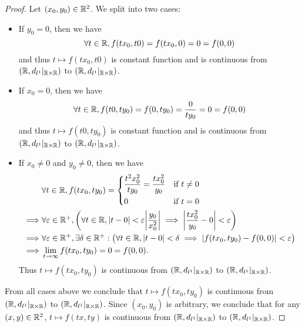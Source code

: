 \begin{proof}
  Let \((x_0, y_0) \in \mathbb{R}^2\).
  We split into two cases:
  \begin{itemize}
    \item If \(y_0 = 0\), then we have
          \[
            \forall t \in \mathbb{R}, f(t x_0, t0) = f(t x_0, 0) = 0 = f(0, 0)
          \]
          and thus \(t \mapsto f(t x_0, t0)\) is constant function and is continuous from \((\mathbb{R}, d_{l^1}|_{\mathbb{R} \times \mathbb{R}})\) to \((\mathbb{R}, d_{l^1}|_{\mathbb{R} \times \mathbb{R}})\).
    \item If \(x_0 = 0\), then we have
          \[
            \forall t \in \mathbb{R}, f(t0, t y_0) = f(0, t y_0) = \dfrac{0}{t y_0} = 0 = f(0, 0)
          \]
          and thus \(t \mapsto f(t0, t y_0)\) is constant function and is continuous from \((\mathbb{R}, d_{l^1}|_{\mathbb{R} \times \mathbb{R}})\) to \((\mathbb{R}, d_{l^1}|_{\mathbb{R} \times \mathbb{R}})\).
    \item If \(x_0 \neq 0\) and \(y_0 \neq 0\), then we have
          \begin{align*}
                     & \forall t \in \R, f(t x_0, t y_0) = \begin{dcases}
                                                             \dfrac{t^2 x_0^2}{t y_0} = \dfrac{t x_0^2}{y_0} & \text{if } t \neq 0 \\
                                                             0                                               & \text{if } t = 0
                                                           \end{dcases}                                                            \\
            \implies & \forall \varepsilon \in \R^+, \bigg(\forall t \in \R, \abs{t - 0} < \varepsilon \abs{\dfrac{y_0}{x_0^2}} \implies \abs{\dfrac{t x_0^2}{y_0} - 0} < \varepsilon\bigg) \\
            \implies & \forall \varepsilon \in \R^+, \exists \delta \in \R^+ : \big(\forall t \in \R, \abs{t - 0} < \delta \implies \abs{f(t x_0, t y_0) - f(0, 0)} < \varepsilon\big)      \\
            \implies & \lim_{t \to \infty} f(t x_0, t y_0) = 0 = f(0, 0).
          \end{align*}
          Thus \(t \mapsto f(t x_0, t y_0)\) is continuous from \((\mathbb{R}, d_{l^1}|_{\mathbb{R} \times \mathbb{R}})\) to \((\mathbb{R}, d_{l^1}|_{\mathbb{R} \times \mathbb{R}})\).
  \end{itemize}
  From all cases above we conclude that \(t \mapsto f(t x_0, t y_0)\) is  continuous from \((\mathbb{R}, d_{l^1}|_{\mathbb{R} \times \mathbb{R}})\) to \((\mathbb{R}, d_{l^1}|_{\mathbb{R} \times \mathbb{R}})\).
  Since \((x_0, y_0)\) is arbitrary, we conclude that for any \((x, y) \in \mathbb{R}^2\), \(t \mapsto f(tx, ty)\) is continuous from \((\mathbb{R}, d_{l^1}|_{\mathbb{R} \times \mathbb{R}})\) to \((\mathbb{R}, d_{l^1}|_{\mathbb{R} \times \mathbb{R}})\).


\end{proof}

